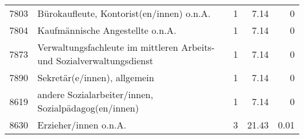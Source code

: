 \begin{longtable}{lXrrr}
     7803 &
     \multicolumn{1}{X}{ Bürokaufleute, Kontorist(en/innen) o.n.A.   } &


       \num{1} &
       \num[round-mode=places,round-precision=2]{7.14} &
         \num[round-mode=places,round-precision=2]{0} \\

     7804 &
     \multicolumn{1}{X}{ Kaufmännische Angestellte o.n.A.   } &


       \num{1} &
       \num[round-mode=places,round-precision=2]{7.14} &
         \num[round-mode=places,round-precision=2]{0} \\

     7873 &
     \multicolumn{1}{X}{ Verwaltungsfachleute im mittleren Arbeits- und Sozialverwaltungsdienst   } &


       \num{1} &
       \num[round-mode=places,round-precision=2]{7.14} &
         \num[round-mode=places,round-precision=2]{0} \\

     7890 &
     \multicolumn{1}{X}{ Sekretär(e/innen), allgemein   } &


       \num{1} &
       \num[round-mode=places,round-precision=2]{7.14} &
         \num[round-mode=places,round-precision=2]{0} \\

     8619 &
     \multicolumn{1}{X}{ andere Sozialarbeiter/innen, Sozialpädagog(en/innen)   } &


       \num{1} &
       \num[round-mode=places,round-precision=2]{7.14} &
         \num[round-mode=places,round-precision=2]{0} \\

     8630 &
     \multicolumn{1}{X}{ Erzieher/innen o.n.A.   } &


       \num{3} &
       \num[round-mode=places,round-precision=2]{21.43} &
         \num[round-mode=places,round-precision=2]{0.01} \\


\end{longtable}
